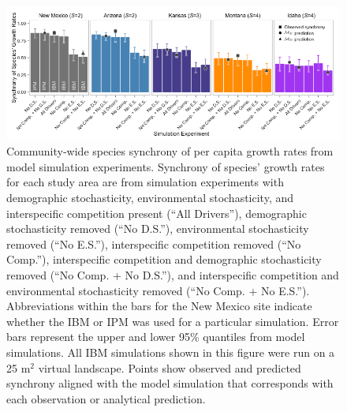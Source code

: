 \documentclass[12pt,]{article}
\begin{document}
\begin{figure}[!ht]
  \centering
      \includegraphics[width=6in]{./components/formatted_figures/formatted_figure1.png}
  \caption{Community-wide species synchrony of per capita growth rates from model simulation experiments. Synchrony of species' growth rates for each study area are from simulation experiments with demographic stochasticity, environmental stochasticity, and interspecific competition present (``All Drivers''), demographic stochasticity removed (``No D.S.''), environmental stochasticity removed (``No E.S.''), interspecific competition removed (``No Comp.''), interspecific competition and demographic stochasticity removed (``No Comp. + No D.S.''), and interspecific competition and environmental stochasticity removed (``No Comp. + No E.S.''). Abbreviations within the bars for the New Mexico site indicate whether the IBM or IPM was used for a particular simulation. Error bars represent the upper and lower 95\% quantiles from model simulations. All IBM simulations shown in this figure were run on a 25 $\text{m}^2$ virtual landscape. Points show observed and predicted synchrony aligned with the model simulation that corresponds with each observation or analytical prediction.}
\end{figure}

\pagebreak{}
\end{document}
